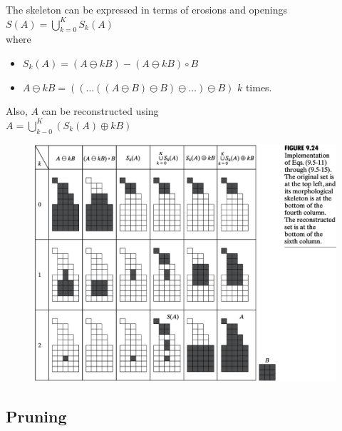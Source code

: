 \begin{frame}
The skeleton can be expressed in terms of erosions and openings
$S(A) = \bigcup_{k=0}^{K} S_{k}(A)$\\
where\\
\begin{itemize}
\item $S_{k}(A) = ( A \ominus k B ) - ( A \ominus k B ) \circ B $
\item $A \ominus kB = (( \ldots ((A \ominus B ) \ominus B ) \ominus \ldots ) \ominus B )$ $k$ times.
\end{itemize}
Also, $A$ can be reconstructed using\\
$A = \bigcup_{k-0}^{K} \left ( S_{k}(A) \oplus kB \right )$
\end{frame}

\begin{frame}
\begin{figure}[!h]
\includegraphics[width=.8\textwidth]{fig-9-24.png}
\end{figure}
\end{frame}

\subsection{Pruning}

